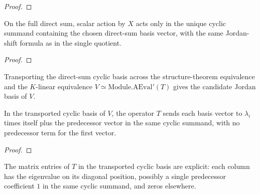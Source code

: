 \begin{proof}
  \leanok
\end{proof}

\begin{theorem}
  \label{thm:direct_sum_x_action}
  \leanok
  On the full direct sum, scalar action by \(X\) acts only in the unique cyclic
  summand containing the chosen direct-sum basis vector, with the same
  Jordan-shift formula as in the single quotient.
\end{theorem}

\begin{proof}
  \leanok
\end{proof}

\begin{definition}
  \label{def:transported_linear_cyclic_basis}
  \leanok
  Transporting the direct-sum cyclic basis across the structure-theorem
  equivalence and the \(K\)-linear equivalence
  \(V\simeq\mathrm{Module.AEval'}(T)\) gives the candidate Jordan basis of
  \(V\).
\end{definition}

\begin{theorem}
  \label{thm:transported_basis_action}
  \leanok
  In the transported cyclic basis of \(V\), the operator \(T\) sends each basis
  vector to \(\lambda_i\) times itself plus the predecessor vector in the same
  cyclic summand, with no predecessor term for the first vector.
\end{theorem}

\begin{proof}
  \leanok
\end{proof}

\begin{theorem}
  \label{thm:transported_basis_matrix_entries}
  \leanok
  The matrix entries of \(T\) in the transported cyclic basis are explicit:
  each column has the eigenvalue on its diagonal position, possibly a single
  predecessor coefficient \(1\) in the same cyclic summand, and zeros
  elsewhere.
\end{theorem}

